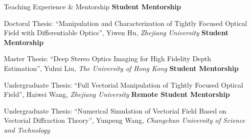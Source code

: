 \begin{rubric}{Teaching Experience \& Mentorship}
    \entry*[2021 -- 2026]%
    \textbf{Student Mentorship}
    \par Doctoral Thesis: ``Manipulation and Characterization of Tightly Focused Optical Field with Differentiable Optics'', Yiwen Hu, \textit{Zhejiang University}
    \entry*[2023]%
    \textbf{Student Mentorship}
    \par Master Thesis: ``Deep Stereo Optics Imaging for High Fidelity Depth Estimation'', Yuhui Liu, \textit{The University of Hong Kong}
    \entry*[2022]%
    \textbf{Student Mentorship}
    \par Undergraduate Thesis: ``Full Vectorial Manipulation of Tightly Focused Optical Field'', Haiwei Wang, \textit{Zhejiang University}
    \entry*[2022]%
    \textbf{Remote Student Mentorship}
    \par Undergraduate Thesis: ``Numerical Simulation of Vectorial Field Based on Vectorial Diffraction Theory'', Yunpeng Wang, \textit{Changchun University of Science and Technology}
\end{rubric}